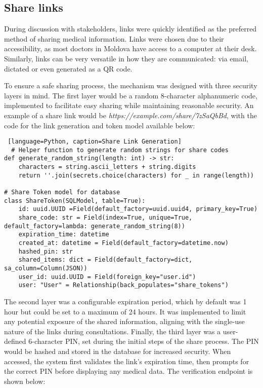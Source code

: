 \subsection{Share links}

During discussion with stakeholders, links were quickly identified as the preferred method of sharing medical information. Links were chosen due to their accessibility, as most doctors in Moldova have access to a computer at their desk. Similarly, links can be very versatile in how they are communicated: via email, dictated or even generated as a QR code.

To ensure a safe sharing process, the mechanism was designed with three security layers in mind. The first layer would be a random 8-character alphanumeric code, implemented to facilitate easy sharing while maintaining reasonable security. An example of a share link would be \textit{https://example.com/share/7zSaQbBd}, with the code for the link generation and token model available below:

\begin{lstlisting} [language=Python, caption=Share Link Generation]
  # Helper function to generate random strings for share codes
def generate_random_string(length: int) -> str:
    characters = string.ascii_letters + string.digits
    return ''.join(secrets.choice(characters) for _ in range(length))

# Share Token model for database
class ShareToken(SQLModel, table=True):
    id: uuid.UUID =Field(default_factory=uuid.uuid4, primary_key=True)
    share_code: str = Field(index=True, unique=True, default_factory=lambda: generate_random_string(8))
    expiration_time: datetime
    created_at: datetime = Field(default_factory=datetime.now)
    hashed_pin: str
    shared_items: dict = Field(default_factory=dict, sa_column=Column(JSON))
    user_id: uuid.UUID = Field(foreign_key="user.id")
    user: "User" = Relationship(back_populates="share_tokens")
\end{lstlisting}

The second layer was a configurable expiration period, which by default was 1 hour but could be set to a maximum of 24 hours. It was implemented to limit any potential exposure of the shared information, aligning with the single-use nature of the links during consultations. Finally, the third layer was a user-defined 6-character PIN, set during the initial steps of the share process. The PIN would be hashed and stored in the database for increased security. When accessed, the system first validates the link's expiration time, then prompts for the correct PIN before displaying any medical data. The verification endpoint is shown below:

